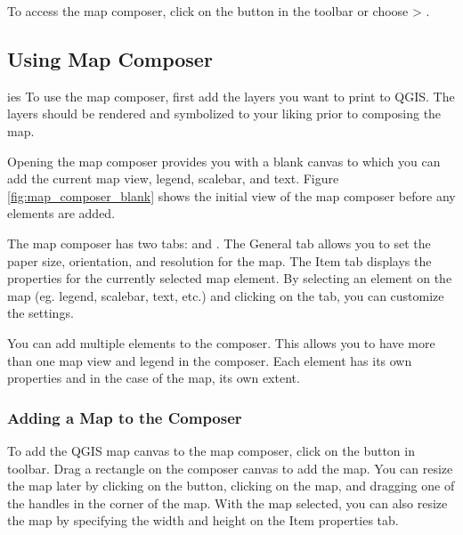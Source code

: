 To access the map composer, click on the 
button in the toolbar or choose  > .

\subsection{Using Map Composer}\label{label_usemapcomposer} 
ies
To use the map composer, first add the layers you
want to print to QGIS. The layers should be rendered and symbolized to your
liking prior to composing the map. 


Opening the map composer provides you with a blank canvas to which you can add
the current map view, legend, scalebar, and text. Figure
\ref{fig:map_composer_blank} shows the initial view of the map composer before
any elements are added.

The map composer has two tabs:  and . The General tab
allows you to set the paper size, orientation, and resolution for the map.
The Item tab displays the properties for the currently selected map element.
By selecting an element on the map (eg. legend, scalebar, text, etc.) and
clicking on the  tab, you can customize the settings.

You can add multiple elements to the composer. This allows you to have more
than one map view and legend in the composer. Each element has its own
properties and in the case of the map, its own extent.

\subsubsection{Adding a Map to the Composer}

To add the QGIS map canvas to the map composer, click on the
button in toolbar. Drag a rectangle on the composer canvas to add the
map. You can resize the map later by clicking on the 
button, clicking on the map, and dragging one of the handles in the corner of
the map. With the map selected, you can also resize the map by specifying the
width and height on the Item properties tab.

